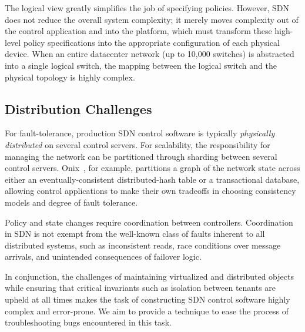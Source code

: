 {The logical view greatly simplifies the job of specifying policies. However, SDN
does not reduce the overall system complexity; it merely moves complexity out of
the control application and into the platform, which must transform these
high-level policy specifications into the appropriate configuration of each
physical device. When an entire datacenter network (up to 10,000 switches) is
abstracted into a single logical switch, the mapping between the logical switch
and the physical topology is highly complex.


\subsection{Distribution Challenges}

For fault-tolerance, production SDN control software is typically \emph{physically
distributed} on several control servers. For scalability, the responsibility for
managing the network can be partitioned through sharding between
several control servers. Onix~\cite{onix}, for example, partitions a
graph of the network state across either an eventually-consistent
distributed-hash table or a
transactional database, allowing control applications to make their own
tradeoffs in choosing consistency models and degree of fault tolerance.

Policy and state changes require coordination between controllers.
Coordination in SDN is not exempt from the well-known class of faults
inherent to all distributed systems, such as
inconsistent reads, race conditions over message arrivals, and
unintended consequences of failover logic.

In conjunction, the challenges of maintaining virtualized and distributed
objects while ensuring that critical invariants such as isolation between
tenants are upheld at all times makes the task of constructing
SDN control software highly complex and error-prone. We aim to provide a
technique to ease the process of troubleshooting bugs encountered in this
task.

}
